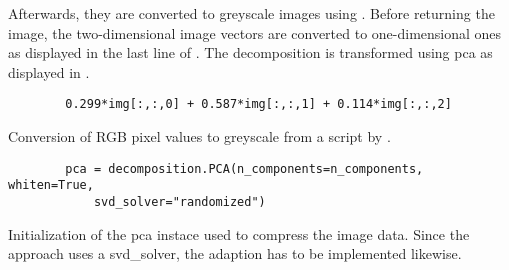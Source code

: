 Afterwards, they are converted to greyscale images using .
Before returning the image, the two-dimensional image vectors are converted to one-dimensional ones as displayed in the last line of .
The decomposition is transformed using \ac{pca} as displayed in .

\begin{listing}[htp]
    \begin{verbatim}
        0.299*img[:,:,0] + 0.587*img[:,:,1] + 0.114*img[:,:,2]
    \end{verbatim}
    \caption{Conversion of RGB pixel values to greyscale from a script by \thesissupervisor{}.}
    \label{lst:rgb2grey}
\end{listing}

\begin{listing}[htp]
    \begin{verbatim}
        pca = decomposition.PCA(n_components=n_components, whiten=True, 
            svd_solver="randomized")
    \end{verbatim}
    \caption{Initialization of the \ac{pca} instace used to compress the image data.
    Since the \eigenfaces{} approach uses a svd\_solver, the adaption \eigendocs{} has to be implemented likewise.
    }
    \label{lst:pca_svd}
\end{listing}


